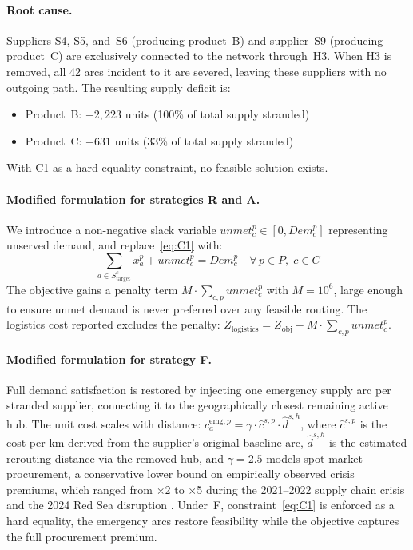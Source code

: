 \paragraph{Root cause.}
Suppliers S4, S5, and~S6 (producing product~B) and supplier~S9
(producing product~C) are exclusively connected to the network through~H3.
When H3 is removed, all 42 arcs incident to it are severed, leaving
these suppliers with no outgoing path. The resulting supply deficit is:

\begin{itemize}[leftmargin=*,itemsep=1pt]
  \item Product~B: $-2{,}223$ units (100\% of total supply stranded)
  \item Product~C: $-631$ units (33\% of total supply stranded)
\end{itemize}

With C1 as a hard equality constraint, no feasible solution exists.

\paragraph{Modified formulation for strategies R and A.}
We introduce a non-negative slack variable $unmet_c^p \in [0, Dem_c^p]$
representing unserved demand, and replace~\eqref{eq:C1} with:
\begin{equation}
  \sum_{a \in S_{\text{target}}^c} x_a^p + unmet_c^p = Dem_c^p
  \quad \forall\, p \in P,\; c \in C
  \label{eq:C1_relaxed}
\end{equation}
The objective gains a penalty term $M \cdot \sum_{c,p} unmet_c^p$ with
$M = 10^6$, large enough to ensure unmet demand is never preferred over
any feasible routing. The logistics cost reported excludes the penalty:
$Z_{\text{logistics}} = Z_{\text{obj}} - M \cdot \sum_{c,p} unmet_c^p$.

\paragraph{Modified formulation for strategy F.}
Full demand satisfaction
is restored by injecting one emergency supply arc per
stranded supplier, connecting it to the geographically
closest remaining active hub. The unit cost scales with
distance: $c_a^{\text{emg},p} = \gamma \cdot \hat{c}^{s,p}
\cdot \hat{d}^{s,h}$, where $\hat{c}^{s,p}$ is the
cost-per-km derived from the supplier's original baseline
arc, $\hat{d}^{s,h}$ is the estimated rerouting distance
via the removed hub, and $\gamma = 2.5$ models spot-market
procurement, a conservative lower bound on empirically observed
crisis premiums, which ranged from $\times$2 to $\times$5 during the
2021--2022 supply chain crisis and the 2024 Red Sea disruption
\cite{hoffmann2022crisis,unctad2024freight}. Under~F, constraint~\eqref{eq:C1} is enforced
as a hard equality, the emergency arcs restore
feasibility while the objective captures the full
procurement premium.

